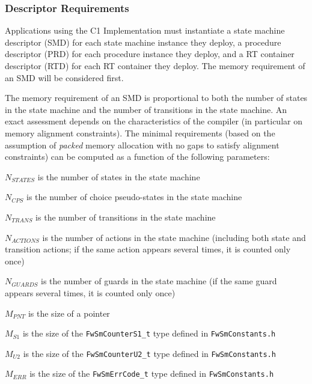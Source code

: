 \documentclass[manual]{../fwprofile}
\begin{document}
\subsubsection{Descriptor Requirements}
Applications using the C1 Implementation must instantiate a state machine descriptor (SMD) for each state machine 
instance they deploy, a procedure descriptor (PRD) for each procedure instance they deploy, and a RT container descriptor (RTD) for each RT container they deploy. 
The memory requirement of an SMD will be considered first.

The memory requirement of an SMD is proportional to both the number of states in the state machine and the number 
of transitions in the state machine. An exact assessment depends on the characteristics of the compiler 
(in particular on memory alignment constraints). The minimal requirements (based on the assumption of \emph{packed} 
memory allocation with no gaps to satisfy alignment constraints) can be computed as a function of the following 
parameters:

\begin{fw_itemize}
\item {$N_{STATES}$} is the number of states in the state machine
\item {$N_{CPS}$} is the number of choice pseudo-states in the state machine
\item {$N_{TRANS}$} is the number of transitions in the state machine
\item {$N_{ACTIONS}$} is the number of actions in the state machine (including both state and transition actions; 
if the same action appears several times, it is counted only once)
\item {$N_{GUARDS}$} is the number of guards in the state machine (if the same guard appears several times, it is counted 
only once)
\item {$M_{PNT}$} is the size of a pointer 
\item {$M_{S1}$} is the size of the \texttt{FwSmCounterS1\_t} type defined in \texttt{FwSmConstants.h} 
\item {$M_{U2}$} is the size of the \texttt{FwSmCounterU2\_t} type defined in \texttt{FwSmConstants.h} 
\item {$M_{ERR}$} is the size of the \texttt{FwSmErrCode\_t} type defined in \texttt{FwSmConstants.h} 
\end{fw_itemize}
\end{document}
